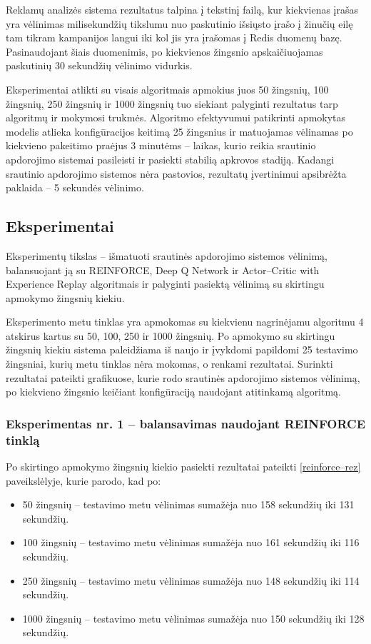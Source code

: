 \documentclass{VUMIFPSbakalaurinis}
\begin{document}
Reklamų analizės sistema rezultatus talpina į tekstinį failą, kur kiekvienas įrašas yra vėlinimas milisekundžių tikslumu nuo paskutinio išsiųsto įrašo į žinučių eilę tam tikram kampanijos langui iki kol jis yra įrašomas į Redis duomenų bazę. Pasinaudojant šiais duomenimis, po kiekvienos žingsnio apskaičiuojamas paskutinių 30 sekundžių vėlinimo vidurkis. 

Eksperimentai atlikti su visais algoritmais apmokius juos 50 žingsnių, 100 žingsnių, 250 žingsnių ir 1000 žingsnių tuo siekiant palyginti rezultatus tarp algoritmų ir mokymosi trukmės. Algoritmo efektyvumui patikrinti apmokytas modelis atlieka konfigūracijos keitimą 25 žingsnius ir matuojamas vėlinamas po kiekvieno pakeitimo praėjus 3 minutėms – laikas, kurio reikia srautinio apdorojimo sistemai pasileisti ir pasiekti stabilią apkrovos stadiją. Kadangi srautinio apdorojimo sistemos nėra pastovios, rezultatų įvertinimui apsibrėžta paklaida – 5 sekundės vėlinimo.

\subsection{Eksperimentai}
Eksperimentų tikslas – išmatuoti srautinės apdorojimo sistemos vėlinimą, balansuojant ją su REINFORCE, Deep Q Network ir Actor–Critic with Experience Replay algoritmais ir palyginti pasiektą vėlinimą su skirtingu apmokymo žingsnių kiekiu.

Eksperimento metu tinklas yra apmokomas su kiekvienu nagrinėjamu algoritmu 4 atskirus kartus su 50, 100, 250 ir 1000 žingsnių. Po apmokymo su skirtingu žingsnių kiekiu sistema paleidžiama iš naujo ir įvykdomi papildomi 25 testavimo žingsniai, kurių metu tinklas nėra mokomas, o renkami rezultatai. Surinkti rezultatai pateikti grafikuose, kurie rodo srautinės apdorojimo sistemos vėlinimą, po kiekvieno žingsnio keičiant konfigūraciją naudojant atitinkamą algoritmą.

\subsubsection{Eksperimentas nr. 1 – balansavimas naudojant REINFORCE tinklą}
Po skirtingo apmokymo žingsnių kiekio pasiekti rezultatai pateikti \ref{reinforce–rez} paveikslėlyje, kurie parodo, kad po:
\begin{itemize}
    \item 50 žingsnių – testavimo metu vėlinimas sumažėja nuo 158 sekundžių iki 131 sekundžių. 
    \item 100 žingsnių – testavimo metu vėlinimas sumažėja nuo 161 sekundžių iki 116 sekundžių.
    \item 250 žingsnių – testavimo metu vėlinimas sumažėja nuo 148 sekundžių iki 114 sekundžių.
    \item 1000 žingsnių – testavimo metu vėlinimas sumažėja nuo 150 sekundžių iki 128 sekundžių.
\end{itemize}
\end{document}
